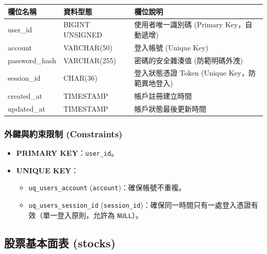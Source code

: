 \documentclass[UTF8, a4paper, 12pt, fontset=none]{ctexart}
\begin{document}
    \begin{center}
    \begin{tabular}{|l|l|p{8cm}|}
    \hline
    \textbf{欄位名稱} & \textbf{資料型態} & \textbf{欄位說明} \\ \hline
    user\_id & BIGINT UNSIGNED & 使用者唯一識別碼 (Primary Key，自動遞增) \\ \hline
    account & VARCHAR(50) & 登入帳號 (Unique Key) \\ \hline
    password\_hash & VARCHAR(255) & 密碼的安全雜湊值 (防範明碼外洩) \\ \hline
    session\_id & CHAR(36) & 登入狀態憑證 Token (Unique Key，防範異地登入) \\ \hline
    created\_at & TIMESTAMP & 帳戶註冊建立時間 \\ \hline
    updated\_at & TIMESTAMP & 帳戶狀態最後更新時間 \\ \hline
    \end{tabular}
    \end{center}

    \subsubsection*{外鍵與約束限制 (Constraints)}
    \begin{itemize}
        \item \textbf{PRIMARY KEY}：\texttt{user\_id}。
        \item \textbf{UNIQUE KEY}：
            \begin{itemize}
                \item \texttt{uq\_users\_account} (\texttt{account})：確保帳號不重複。
                \item \texttt{uq\_users\_session\_id} (\texttt{session\_id})：確保同一時間只有一處登入憑證有效（單一登入原則，允許為 \texttt{NULL}）。
            \end{itemize}
    \end{itemize}

    \subsection{股票基本面表 (stocks)}
    
\end{document}
